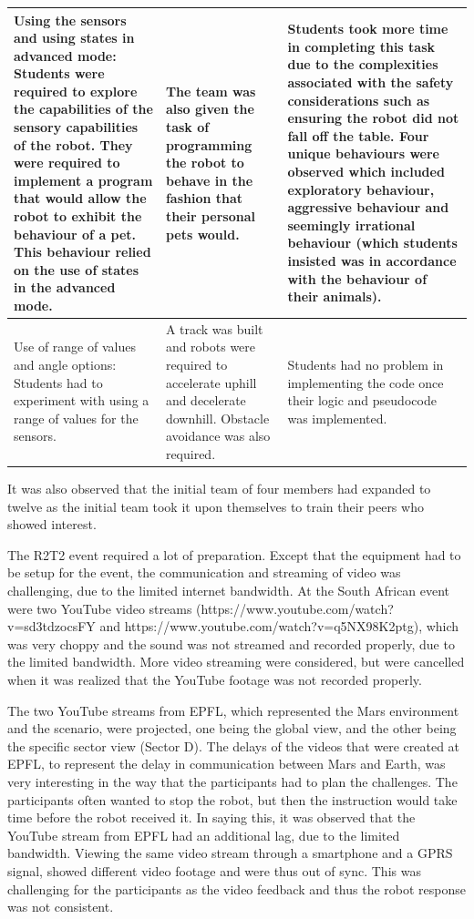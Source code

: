 \documentclass{intech-journal}
\begin{document}
\begin{table}
\begin{tabular}{|p{5cm}|p{5cm}|p{5cm}|}
Using the sensors and using states in advanced mode: Students were required to explore the capabilities of the sensory capabilities of the robot. They were required to implement a program that would allow the robot to exhibit the behaviour of a pet. This behaviour relied on the use of states in the advanced mode. &
The team was also given the task of programming the robot to behave in the fashion that their personal pets would.  &
Students took more time in completing this task due to the complexities associated with the safety considerations such as ensuring the robot did not fall off the table. Four unique behaviours were observed which included exploratory behaviour, aggressive behaviour and seemingly irrational behaviour (which students insisted was in accordance with the behaviour of their animals). \\\hline
Use of range of values and angle options: Students had to experiment with using a range of values for the sensors. &
A track was built and robots were required to accelerate uphill and decelerate downhill. Obstacle avoidance was also required.  &
Students had no problem in implementing the code once their logic and pseudocode was implemented. \\\hline

\end{tabular}

\end{table}



It was also observed that the initial team of four members had expanded to twelve as the initial team took it upon themselves to train their peers who showed interest. 

The R2T2 event required a lot of preparation. Except that the equipment had to be setup for the event, the communication and streaming of video was challenging, due to the limited internet bandwidth. At the South African event were two YouTube video streams (https://www.youtube.com/watch?v=sd3tdzocsFY and https://www.youtube.com/watch?v=q5NX98K2ptg), which was very choppy and the sound was not streamed and recorded properly, due to the limited bandwidth. More video streaming were considered, but were cancelled when it was realized that the YouTube footage was not recorded properly.

The two YouTube streams from EPFL, which represented the Mars environment and the scenario, were projected, one being the global view, and the other being the specific sector view (Sector D). The delays of the videos that were created at EPFL, to represent the delay in communication between Mars and Earth, was very interesting in the way that the participants had to plan the challenges. The participants often wanted to stop the robot, but then the instruction would take time before the robot received it. In saying this, it was observed that the YouTube stream from EPFL had an additional lag, due to the limited bandwidth. Viewing the same video stream through a smartphone and a GPRS signal, showed different video footage and were thus out of sync. This was challenging for the participants as the video feedback and thus the robot response was not consistent.
\end{document}
